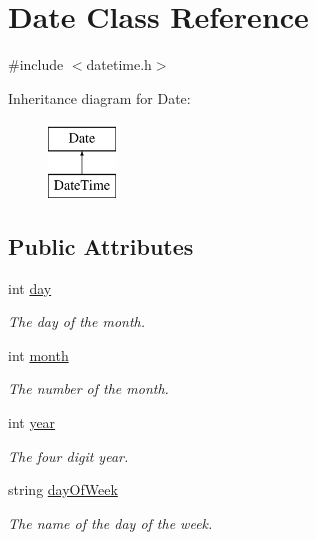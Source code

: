\hypertarget{structDate}{\section{Date Class Reference}
\label{structDate}
}


{\ttfamily \#include $<$datetime.\-h$>$}

Inheritance diagram for Date\-:\begin{figure}[H]
\begin{center}
\leavevmode
\includegraphics[height=2.000000cm]{structDate}
\end{center}
\end{figure}
\subsection*{Public Attributes}
\begin{DoxyCompactItemize}
\item 
\hypertarget{structDate_a5b192adcabf2b2871e3f0b76c1ec1601}{int \hyperlink{structDate_a5b192adcabf2b2871e3f0b76c1ec1601}{day}}\label{structDate_a5b192adcabf2b2871e3f0b76c1ec1601}

\begin{DoxyCompactList}\small\item\em The day of the month. \end{DoxyCompactList}\item 
\hypertarget{structDate_a533843e07c6ac8d19fee9b16f5336ba2}{int \hyperlink{structDate_a533843e07c6ac8d19fee9b16f5336ba2}{month}}\label{structDate_a533843e07c6ac8d19fee9b16f5336ba2}

\begin{DoxyCompactList}\small\item\em The number of the month. \end{DoxyCompactList}\item 
\hypertarget{structDate_a3eeced2ed56bc95d56782b9e738db8ea}{int \hyperlink{structDate_a3eeced2ed56bc95d56782b9e738db8ea}{year}}\label{structDate_a3eeced2ed56bc95d56782b9e738db8ea}

\begin{DoxyCompactList}\small\item\em The four digit year. \end{DoxyCompactList}\item 
\hypertarget{structDate_a354c151de1d380763cf650f597944485}{string \hyperlink{structDate_a354c151de1d380763cf650f597944485}{day\-Of\-Week}}\label{structDate_a354c151de1d380763cf650f597944485}

\begin{DoxyCompactList}\small\item\em The name of the day of the week. \end{DoxyCompactList}\end{DoxyCompactItemize}


